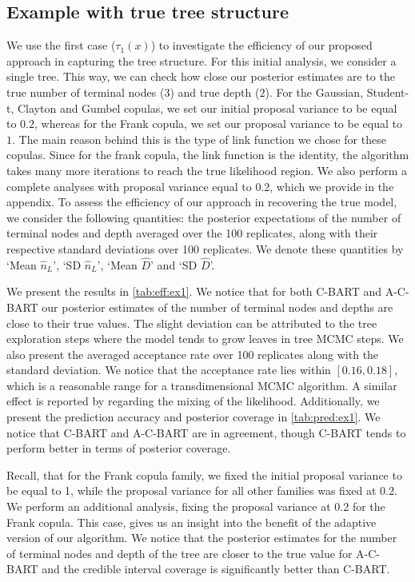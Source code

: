 \documentclass[
12pt]{article}
\begin{document}
	\subsection{Example with true tree structure} 
	
	We use the first case ($\tau_1(x)$) to investigate the efficiency of our proposed approach in capturing the tree structure. For this initial analysis, we consider a single tree. This way, we can check how close our posterior estimates are to the true number of terminal nodes ($3$) and true depth ($2$). For the Gaussian, Student-t, Clayton and Gumbel copulas, we set our initial proposal variance to be equal to $0.2$, whereas for the Frank copula, we set our proposal variance to be equal to $1$. The main reason behind this is the type of link function we chose for these copulas. Since for the frank copula, the link function is the identity, the algorithm takes many more iterations to reach the true likelihood region. We also perform a complete analyses with proposal variance equal to 0.2, which we provide in the appendix. To assess the efficiency of our approach in recovering the true model, we consider the following quantities: the posterior expectations of the number of terminal nodes and depth averaged over the 100 replicates, along with their respective standard deviations over 100 replicates. We denote these quantities by `Mean $\hat{n}_L$', `SD $\hat{n}_L$', `Mean $\hat{D}$' and `SD $\hat{D}$'.
	
	We present the results in \cref{tab:eff:ex1}. We notice that for both C-BART and A-C-BART our posterior estimates of the number of terminal nodes and depths are close to their true values. The slight deviation can be attributed to the tree exploration steps where the model tends to grow leaves in tree MCMC steps. We also present the averaged acceptance rate over 100 replicates along with the standard deviation. We notice that the acceptance rate lies within $[0.16, 0.18]$, which is a reasonable range for a transdimensional MCMC algorithm. A similar effect is reported by \citet{Linero02012025} regarding the mixing of the likelihood. Additionally, we present the prediction accuracy and posterior coverage in \cref{tab:pred:ex1}. We notice that C-BART and A-C-BART are in agreement, though C-BART tends to perform better in terms of posterior coverage.
	
	Recall, that for the Frank copula family, we fixed the initial proposal variance to be equal to 1, while the proposal variance for all other families was fixed at 0.2. We perform an additional analysis, fixing the proposal variance at 0.2 for the Frank copula. This case, gives us an insight into the benefit of the adaptive version of our algorithm. We notice that the posterior estimates for the number of terminal nodes and depth of the tree are closer to the true value for A-C-BART and the credible interval coverage is significantly better than C-BART. 
	
\end{document}
